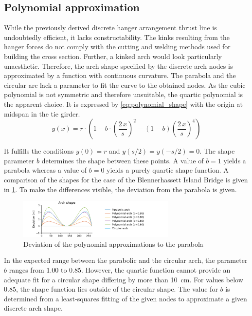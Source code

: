 \subsection{Polynomial approximation} \label{sec:polynomial_approximation}
While the previously derived discrete hanger arrangement thrust line is undoubtedly efficient, it lacks constructability. The kinks resulting from the hanger forces do not comply with the cutting and welding methods used for building the cross section. Further, a kinked arch would look particularly unaesthetic. Therefore, the arch shape specified by the discrete arch nodes is approximated by a function with continuous curvature. The parabola and the circular arc lack a parameter to fit the curve to the obtained nodes. As the cubic polynomial is not symmetric and therefore unsuitable, the quartic polynomial is the apparent choice. It is expressed by \cref{eq:polynomial_shape} with the origin at midspan in the tie girder.
\begin{equation}
    y(x)=r \cdot \left(1 - b \cdot \left(\frac{2\,x}{s}\right)^2 - (1-b) \left(\frac{2\,x}{s}\right)^4 \right)
    \label{eq:polynomial_shape}
\end{equation}

It fulfills the conditions $y(0)=r$ and $y(s/2)=y(-s/2)=0$. The shape parameter $b$ determines the shape between these points. A value of $b=1$ yields a parabola whereas a value of $b=0$ yields a purely quartic shape function. A comparison of the shapes for the case of the Blennerhassett Island Bridge is given in \cref{fig:polynomial_shapes}. To make the differences visible, the deviation from the parabola is given.

\begin{figure}[H]
    \centering
    \includegraphics[trim={1cm 0 3cm 0},clip, width=0.70\textwidth]{illustrations/polynomial shapes.png}
    \caption{Deviation of the polynomial approximations to the parabola}
    \label{fig:polynomial_shapes}
\end{figure}

In the expected range between the parabolic and the circular arch, the parameter $b$ ranges from 1.00 to 0.85. However, the quartic function cannot provide an adequate fit for a circular shape differing by more than \SI{10}{cm}. For values below 0.85, the shape function lies outside of the circular shape. The value for $b$ is determined from a least-squares fitting of the given nodes to approximate a given discrete arch shape.

